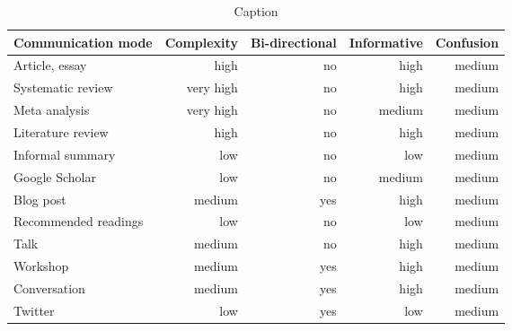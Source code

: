 \begin{table*}\centering
{}
\begin{tabular}{@{}lrrrr@{}}\toprule
Communication mode & Complexity & Bi-directional & Informative  & Confusion
\\\midrule
Article, essay      & high      & no    & high & medium  \\
Systematic review   & very high & no    & high & medium\\
Meta analysis       & very high & no    & medium & medium\\
Literature review   & high      & no    & high & medium\\
Informal summary    & low       & no    & low & medium\\
Google Scholar      & low       & no    & medium & medium\\
Blog post           & medium    & yes   & high & medium\\
Recommended readings& low       & no    & low & medium\\
Talk                & medium    & no    & high & medium\\
Workshop            & medium    & yes   & high & medium\\
Conversation        & medium    & yes   & high & medium\\
Twitter             & low       & yes   & low & medium\\
\bottomrule
\end{tabular}
\caption{Caption}
\end{table*}